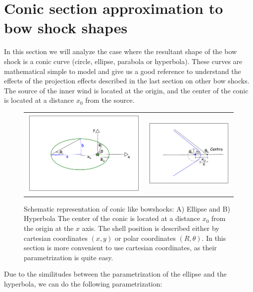 \section{Conic section approximation to bow shock shapes}
\label{sec:conic}

\newcommand\Sin{\ensuremath{\mathcal{S}}}
\newcommand\Cos{\ensuremath{\mathcal{C}}}
\newcommand\Cot{\ensuremath{\mathcal{T}}}

In this section we will analyze the case where the resultant shape  of the bow shock is a conic curve (circle, ellipse, parabola or hyperbola).
These curves are mathematical simple to model and give us a good reference to understand the effects of the projection effects
described in the last section on other bow shocks. The source of the inner wind is located at the origin, and the center of the conic is located at
a distance $x_0$ from the source.

\begin{figure}
\begin{tabular}{cc}
\includegraphics[width=0.4\linewidth]{ellipse} &
\includegraphics[width=0.4\linewidth]{hiperbola}
\end{tabular}
\label{fig:conics}
\caption{Schematic representation of conic like bowshocks: A) Ellipse and B) Hyperbola The center of the conic is located at a distance $x_0$ from the origin at the $x$ axis. The shell position is 
described either by cartesian coordinates $(x,y)$ or polar coordinates $(R,\theta)$. In this section is more convenient to use cartesian coordinates, as their parametrization is quite easy.}
\end{figure}
Due to the similitudes between the parametrization of the ellipse and the hyperbola, we can do the following parametrization:

